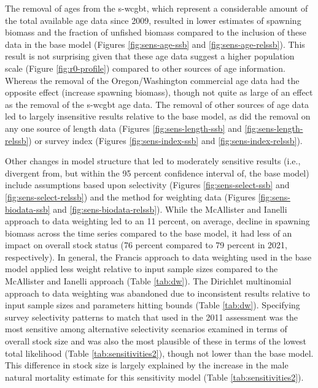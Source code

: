 \documentclass[11pt,
  english,
  a4paper,
]{article}
\begin{document}
\leavevmode\tagmcend\tagstructend\par


The removal of ages from the \gls{s-wcgbt}, which represent a considerable amount of the total available age data since 2009, resulted in lower estimates of spawning biomass and the fraction of unfished biomass compared to the inclusion of these data in the base model (Figures \ref{fig:sens-age-ssb} and \ref{fig:sens-age-relssb}). This result is not surprising given that these age data suggest a higher population scale (Figure \ref{fig:r0-profile}) compared to other sources of age information. Whereas the removal of the Oregon/Washington commercial age data had the opposite effect (increase spawning biomass), though not quite as large of an effect as the removal of the \gls{s-wcgbt} age data. The removal of other sources of age data led to largely insensitive results relative to the base model, as did the removal on any one source of length data (Figures \ref{fig:sens-length-ssb} and \ref{fig:sens-length-relssb}) or survey index (Figures \ref{fig:sens-index-ssb} and \ref{fig:sens-index-relssb}).

\leavevmode\tagmcend\tagstructend\par


Other changes in model structure that led to moderately sensitive results (i.e., divergent from, but within the 95 percent confidence interval of, the base model) include assumptions based upon selectivity (Figures \ref{fig:sens-select-ssb} and \ref{fig:sens-select-relssb}) and the method for weighting data (Figures \ref{fig:sens-biodata-ssb} and \ref{fig:sens-biodata-relssb}). While the McAllister and Ianelli approach to data weighting led to an 11 percent, on average, decline in spawning biomass across the time series compared to the base model, it had less of an impact on overall stock status (76 percent compared to 79 percent in 2021, respectively). In general, the Francis approach to data weighting used in the base model applied less weight relative to input sample sizes compared to the McAllister and Ianelli approach (Table \ref{tab:dw}). The Dirichlet multinomial approach to data weighting was abandoned due to inconsistent results relative to input sample sizes and parameters hitting bounds (Table \ref{tab:dw}). Specifying survey selectivity patterns to match that used in the 2011 assessment was the most sensitive among alternative selectivity scenarios examined in terms of overall stock size and was also the most plausible of these in terms of the lowest total likelihood (Table \ref{tab:sensitivities2}), though not lower than the base model. This difference in stock size is largely explained by the increase in the male natural mortality estimate for this sensitivity model (Table \ref{tab:sensitivities2}).
\end{document}
